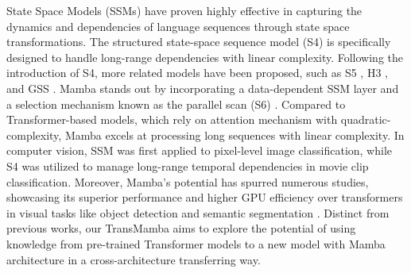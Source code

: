 

 State Space Models (SSMs) \citep{DBLP:journals/corr/abs-2312-00752,DBLP:conf/iclr/FuDSTRR23,DBLP:conf/iclr/GuJTRR23,DBLP:journals/corr/abs-2401-10166,DBLP:journals/corr/abs-2403-17695,DBLP:journals/corr/abs-2401-09417,DBLP:journals/corr/abs-2403-13600,DBLP:journals/corr/abs-2403-06977,DBLP:conf/iclr/GuGR22} have proven highly effective in capturing the dynamics and dependencies of language sequences through state space transformations.  
The structured state-space sequence model (S4) \citep{DBLP:conf/iclr/GuGR22,DBLP:conf/nips/GuG0R22,tang2024muse} is specifically designed to handle long-range dependencies with linear complexity.  
Following the introduction of S4, more related models have been proposed, such as S5 \citep{DBLP:conf/iclr/SmithWL23}, H3 \citep{DBLP:conf/iclr/FuDSTRR23}, and GSS \citep{DBLP:conf/iclr/Mehta0CN23}.  
Mamba stands out by incorporating a data-dependent SSM layer and a selection mechanism known as the parallel scan (S6) \citep{DBLP:journals/corr/abs-2312-00752}. 
 Compared to Transformer-based models, which rely on attention mechanism with quadratic-complexity, Mamba excels at processing long sequences with linear complexity.  
In computer vision, SSM was first applied to pixel-level image classification, while S4 was utilized to manage long-range temporal dependencies in movie clip classification.  
Moreover, Mamba's potential has spurred numerous studies, showcasing its superior performance and higher GPU efficiency over transformers in visual tasks like object detection \citep{DBLP:journals/pieee/ZouCSGY23} and semantic segmentation \citep{DBLP:journals/corr/abs-2401-04722}.  
Distinct from previous works, our TransMamba aims to explore the potential of using knowledge from pre-trained Transformer models to a new model with Mamba architecture in a cross-architecture transferring way.



